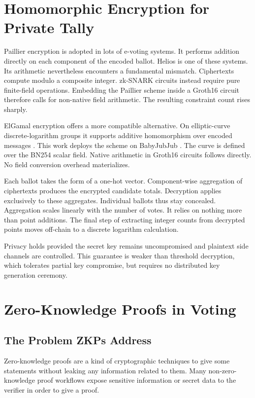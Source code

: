 \section{Homomorphic Encryption for Private Tally}

Paillier encryption \cite{paillier1999} is adopted in lots of e-voting systems. It performs addition directly on each component of the encoded ballot. Helios \cite{adida2008} is one of these systems. Its arithmetic nevertheless encounters a fundamental mismatch. Ciphertexts compute modulo a composite integer. zk-SNARK circuits instead require pure finite-field operations. Embedding the Paillier scheme inside a Groth16 circuit therefore calls for non-native field arithmetic. The resulting constraint count rises sharply.

ElGamal encryption offers a more compatible alternative. On elliptic-curve discrete-logarithm groups it supports additive homomorphism over encoded messages \cite{elgamal1985,hankerson2004ecc}. This work deploys the scheme on BabyJubJub \cite{eip2494}. The curve is defined over the BN254 scalar field. Native arithmetic in Groth16 circuits follows directly. No field conversion overhead materializes.

Each ballot takes the form of a one-hot vector. Component-wise aggregation of ciphertexts produces the encrypted candidate totals. Decryption applies exclusively to these aggregates. Individual ballots thus stay concealed. Aggregation scales linearly with the number of votes. It relies on nothing more than point additions. The final step of extracting integer counts from decrypted points moves off-chain to a discrete logarithm calculation.

Privacy holds provided the secret key remains uncompromised and plaintext side channels are controlled. This guarantee is weaker than threshold decryption, which tolerates partial key compromise, but requires no distributed key generation ceremony.

\section{Zero-Knowledge Proofs in Voting}

\subsection{The Problem ZKPs Address}

Zero-knowledge proofs are a kind of cryptographic techniques to give some statements without leaking any information related to them. Many non-zero-knowledge proof workflows expose sensitive information or secret data to the verifier in order to give a proof.

